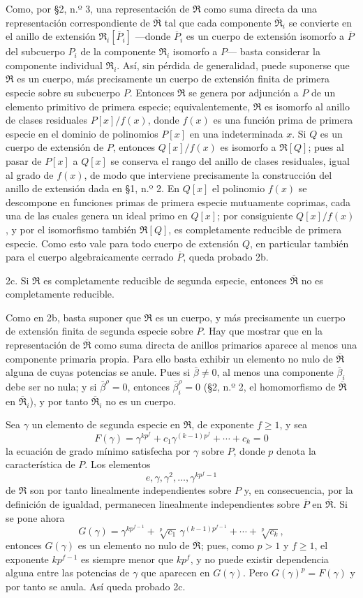 \documentclass[11pt]{article}
\providecommand{\mR}{\mathfrak{R}}
\providecommand{\bR}{\overline{\mathfrak{R}}}
\providecommand{\bP}{\overline{P}}
\begin{document}
Como, por \S 2, n.º 3, una representación de $\mR$ como suma directa da una representación correspondiente de $\bR$ tal que cada componente $\bR_i$ se convierte en el anillo de extensión $\mR_i[\bP_i]$ ---donde $\bP_i$ es un cuerpo de extensión isomorfo a $\bP$ del subcuerpo $P_i$ de la componente $\mR_i$ isomorfo a $P$--- basta considerar la componente individual $\mR_i$. Así, sin pérdida de generalidad, puede suponerse que $\mR$ es un cuerpo, más precisamente un cuerpo de extensión finita de primera especie sobre su subcuerpo $P$. Entonces $\mR$ se genera por adjunción a $P$ de un elemento primitivo de primera especie; equivalentemente, $\mR$ es isomorfo al anillo de clases residuales $P[x]/f(x)$, donde $f(x)$ es una función prima de primera especie en el dominio de polinomios $P[x]$ en una indeterminada $x$. Si $Q$ es un cuerpo de extensión de $P$, entonces $Q[x]/f(x)$ es isomorfo a $\mR[Q]$; pues al pasar de $P[x]$ a $Q[x]$ se conserva el rango del anillo de clases residuales, igual al grado de $f(x)$, de modo que interviene precisamente la construcción del anillo de extensión dada en \S 1, n.º 2. En $Q[x]$ el polinomio $f(x)$ se descompone en funciones primas de primera especie mutuamente coprimas, cada una de las cuales genera un ideal primo en $Q[x]$; por consiguiente $Q[x]/f(x)$, y por el isomorfismo también $\mR[Q]$, es completamente reducible de primera especie. Como esto vale para todo cuerpo de extensión $Q$, en particular también para el cuerpo algebraicamente cerrado $\bP$, queda probado 2b.

2c. Si $\mR$ es completamente reducible de segunda especie, entonces $\bR$ no es completamente reducible.

Como en 2b, basta suponer que $\mR$ es un cuerpo, y más precisamente un cuerpo de extensión finita de segunda especie sobre $P$. Hay que mostrar que en la representación de $\bR$ como suma directa de anillos primarios aparece al menos una componente primaria propia. Para ello basta exhibir un elemento no nulo de $\bR$ alguna de cuyas potencias se anule. Pues si $\bar\beta\ne0$, al menos una componente $\bar\beta_i$ debe ser no nula; y si $\bar\beta^\rho=0$, entonces $\bar\beta_i^\rho=0$ (\S 2, n.º 2, el homomorfismo de $\bR$ en $\bR_i$), y por tanto $\bR_i$ no es un cuerpo.

Sea $\gamma$ un elemento de segunda especie en $\mR$, de exponente $f\ge1$, y sea
\[
        F(\gamma)=\gamma^{kp^f}+c_1\gamma^{(k-1)p^f}+\cdots+c_k=0
\]
la ecuación de grado mínimo satisfecha por $\gamma$ sobre $P$, donde $p$ denota la característica de $P$. Los elementos
\[
        e,\gamma,\gamma^2,\ldots,\gamma^{kp^f-1}
\]
de $\mR$ son por tanto linealmente independientes sobre $P$ y, en consecuencia, por la definición de igualdad, permanecen linealmente independientes sobre $\bP$ en $\bR$. Si se pone ahora
\[
        G(\gamma)=\gamma^{kp^{f-1}}+\sqrt[p]{c_1}\,\gamma^{(k-1)p^{f-1}}+
        \cdots+\sqrt[p]{c_k},
\]
entonces $G(\gamma)$ es un elemento no nulo de $\bR$; pues, como $p>1$ y $f\ge1$, el exponente $kp^{f-1}$ es siempre menor que $kp^f$, y no puede existir dependencia alguna entre las potencias de $\gamma$ que aparecen en $G(\gamma)$. Pero $G(\gamma)^p=F(\gamma)$ y por tanto se anula. Así queda probado 2c.
\end{document}
